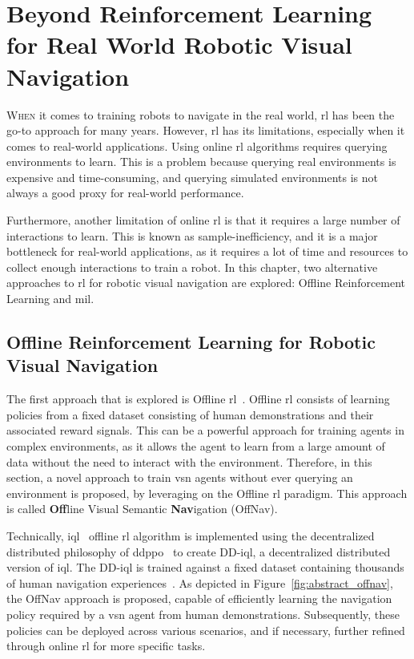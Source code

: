 \chapter[Beyond RL for Real World Robotic Navigation]{Beyond Reinforcement Learning for Real World Robotic Visual Navigation}\label{ch:beyond-rl}

\lettrine{\textcolor{accent_color}{W}}{hen} it comes to training robots to navigate in the real world, \acrshort{rl} has been the go-to approach for many years.
However, \acrshort{rl} has its limitations, especially when it comes to real-world applications.
Using online \acrshort{rl} algorithms requires querying environments to learn.
This is a problem because querying real environments is expensive and time-consuming, and querying simulated environments is not always a good proxy for real-world performance.

Furthermore, another limitation of online \acrshort{rl} is that it requires a large number of interactions to learn.
This is known as sample-inefficiency, and it is a major bottleneck for real-world applications, as it requires a lot of time and resources to collect enough interactions to train a robot.
In this chapter, two alternative approaches to \acrshort{rl} for robotic visual navigation are explored: Offline Reinforcement Learning and \acrfull{mil}.


\section{Offline Reinforcement Learning for Robotic Visual Navigation}\label{sec:offline_rl4rvsn}

The first approach that is explored is Offline \acrshort{rl}~\cite{levine2020}.
Offline \acrshort{rl} consists of learning policies from a fixed dataset consisting of human demonstrations and their associated reward signals.
This can be a powerful approach for training agents in complex environments, as it allows the agent to learn from a large amount of data without the need to interact with the environment.
Therefore, in this section, a novel approach to train \acrshort{vsn} agents without ever querying an environment is proposed, by leveraging on the Offline \acrshort{rl} paradigm.
This approach is called \textbf{Off}line Visual Semantic \textbf{Nav}igation (OffNav).

Technically, \acrfull{iql}~\cite{kostrikov2022offline} offline \acrshort{rl} algorithm is implemented using the decentralized distributed philosophy of \acrshort{ddppo}~\cite{wijmans2020} to create DD-\acrshort{iql}, a decentralized distributed version of \acrshort{iql}\@.
The DD-\acrshort{iql} is trained against a fixed dataset containing thousands of human navigation experiences~\cite{ramrakhya2023}.
As depicted in Figure~\ref{fig:abstract_offnav}, the OffNav approach is proposed, capable of efficiently learning the navigation policy required by a \acrshort{vsn} agent from human demonstrations.
Subsequently, these policies can be deployed across various scenarios, and if necessary, further refined through online \acrshort{rl} for more specific tasks.

